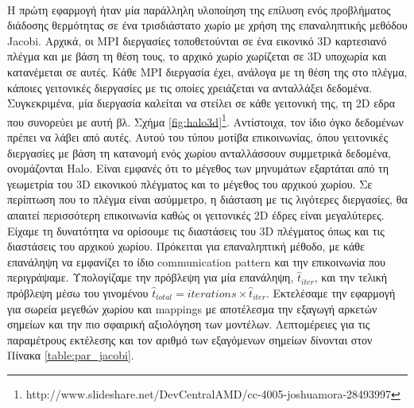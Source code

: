 \paragraph{}
Η πρώτη εφαρμογή ήταν μία παράλληλη υλοποίηση της επίλυση ενός προβλήματος διάδοσης θερμότητας σε ένα τρισδιάστατο χωρίο με χρήση της επαναληπτικής μεθόδου Jacobi. Αρχικά, οι MPI διεργασίες τοποθετούνται σε ένα εικονικό 3D καρτεσιανό πλέγμα και με βάση τη θέση τους, το αρχικό χωρίο χωρίζεται σε 3D υποχωρία και κατανέμεται σε αυτές. Κάθε MPI διεργασία έχει, ανάλογα με τη θέση της στο πλέγμα, κάποιες γειτονικές διεργασίες με τις οποίες χρειάζεται να ανταλλάξει δεδομένα.  Συγκεκριμένα, μία διεργασία καλείται να στείλει σε κάθε γειτονική της, τη 2D εδρα που συνορεύει με αυτή βλ. Σχήμα \ref{fig:halo3d}\footnote{http://www.slideshare.net/DevCentralAMD/cc-4005-joshuamora-28493997}. Αντίστοιχα, τον ίδιο όγκο δεδομένων πρέπει να λάβει από αυτές. Αυτού του τύπου μοτίβα επικοινωνίας, όπου γειτονικές διεργασίες με βάση τη κατανομή ενός χωρίου ανταλλάσσουν συμμετρικά δεδομένα, ονομάζονται Halo. Είναι εμφανές ότι το μέγεθος των μηνυμάτων εξαρτάται από τη γεωμετρία του 3D εικονικού πλέγματος και το μέγεθος του αρχικού χωρίου. Σε περίπτωση που το πλέγμα είναι ασύμμετρο, η διάσταση με τις λιγότερες διεργασίες, θα απαιτεί περισσότερη επικοινωνία καθώς οι γειτονικές 2D έδρες είναι μεγαλύτερες. Είχαμε τη δυνατότητα να ορίσουμε τις διαστάσεις του 3D πλέγματος όπως και τις διαστάσεις του αρχικού χωρίου. Πρόκειται για επαναληπτική μέθοδο, με κάθε επανάληψη να εμφανίζει το ίδιο communication pattern και την επικοινωνία που περιγράψαμε. Υπολογίζαμε την πρόβλεψη για μία επανάληψη, $\hat{t}_{iter}$, και την τελική πρόβλεψη μέσω του γινομένου $\hat{t}_{total}= iterations \times \hat{t}_{iter}$. Εκτελέσαμε την εφαρμογή για σωρεία μεγεθών χωρίου και mappings με αποτέλεσμα την εξαγωγή αρκετών σημείων και την πιο σφαιρική αξιολόγηση των μοντέλων. Λεπτομέρειες για τις παραμέτρους εκτέλεσης και τον αριθμό των εξαγόμενων σημείων δίνονται στον Πίνακα \ref{table:par_jacobi}.


